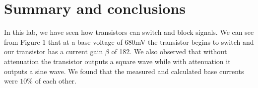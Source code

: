 \documentclass[11pt,letterpaper,onecolumn]{article}
\begin{document}
\section{Summary and conclusions}

In this lab, we have seen how transistors can switch and block signals. We can see from Figure 1 that at a base voltage of 680mV the transistor begins to switch and our transistor has a current gain $\beta$ of 182. We also observed that without attenuation the transistor outputs a square wave while with attenuation it outputs a sine wave. We found that the measured and calculated base currents were $10\%$ of each other. 






\end{document}
